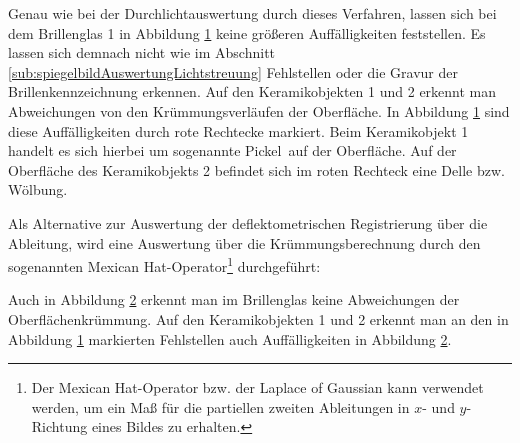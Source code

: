 {
	\begin{figure}[H]
		\centering
		
		\label{tikz:abbAbleitungRegistrierungSpiegel}
	\end{figure}
}

\noindent
Genau wie bei der Durchlichtauswertung durch dieses Verfahren, lassen sich bei dem Brillenglas 1 in Abbildung \ref{tikz:abbAbleitungRegistrierungSpiegel} keine größeren Auffälligkeiten feststellen.
Es lassen sich demnach nicht wie im Abschnitt \ref{sub:spiegelbildAuswertungLichtstreuung} Fehlstellen oder die Gravur der Brillenkennzeichnung erkennen.
Auf den Keramikobjekten 1 und 2 erkennt man Abweichungen von den Krümmungsverläufen der Oberfläche.
In Abbildung \ref{tikz:abbAbleitungRegistrierungSpiegel} sind diese Auffälligkeiten durch rote Rechtecke markiert.
Beim Keramikobjekt 1 handelt es sich hierbei um sogenannte  \glqq Pickel\grqq ~auf der Oberfläche.
Auf der Oberfläche des Keramikobjekts 2 befindet sich im roten Rechteck eine Delle bzw. Wölbung.

\p
Als Alternative zur Auswertung der deflektometrischen Registrierung über die Ableitung, wird eine Auswertung über die Krümmungsberechnung durch den sogenannten \glqq Mexican Hat\grqq -Operator\footnote{
Der \glqq Mexican Hat\grqq -Operator bzw. der Laplace of Gaussian kann verwendet werden, um ein Maß für die partiellen zweiten Ableitungen in $x$- und $y$-Richtung eines Bildes zu erhalten.
} durchgeführt:

{
	\begin{figure}[H]
		\centering
		
		\label{tikz:abbMexicanHatRegistrierung}
	\end{figure}
}

\noindent
Auch in Abbildung \ref{tikz:abbMexicanHatRegistrierung} erkennt man im Brillenglas keine Abweichungen der Oberflächen\-krümmung.
Auf den Keramikobjekten 1 und 2 erkennt man an den in Abbildung \ref{tikz:abbAbleitungRegistrierungSpiegel} markierten Fehlstellen auch Auffälligkeiten in Abbildung \ref{tikz:abbMexicanHatRegistrierung}.